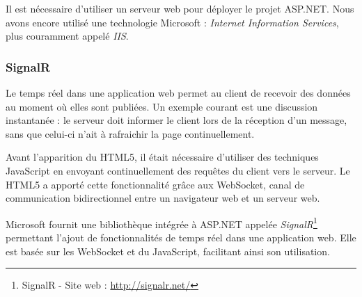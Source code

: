Il est nécessaire d'utiliser un serveur web pour déployer le projet ASP.NET.
Nous avons encore utilisé une technologie Microsoft : \textit{Internet Information Services}, plus couramment appelé \textit{IIS}.


\subsubsection{SignalR}

Le temps réel dans une application web permet au client de recevoir des données au moment où elles sont publiées.
Un exemple courant est une discussion instantanée : le serveur doit informer le client lors de la réception d'un message, sans que celui-ci n'ait à rafraichir la page continuellement.

Avant l'apparition du HTML5, il était nécessaire d'utiliser des techniques JavaScript en envoyant continuellement des requêtes du client vers le serveur.
Le HTML5 a apporté cette fonctionnalité grâce aux WebSocket, canal de communication bidirectionnel entre un navigateur web et un serveur web.

Microsoft fournit une bibliothèque intégrée à ASP.NET appelée \textit{SignalR}\footnote{SignalR - Site web : \url{http://signalr.net/}} permettant l'ajout de fonctionnalités de temps réel dans une application web.
Elle est basée sur les WebSocket et du JavaScript, facilitant ainsi son utilisation.